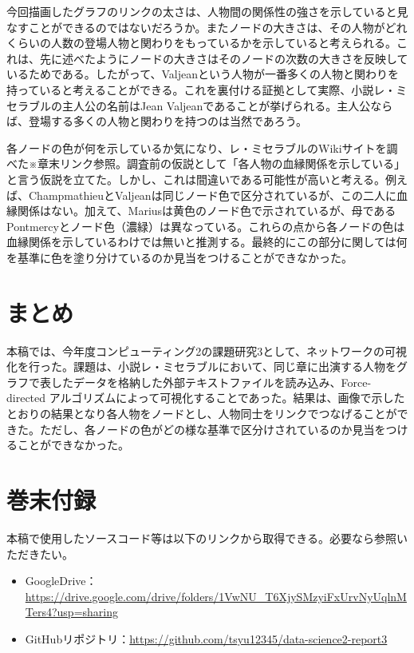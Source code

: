 \documentclass[dvipdfmx]{jsarticle}
\begin{document}
今回描画したグラフのリンクの太さは、人物間の関係性の強さを示していると見なすことができるのではないだろうか。またノードの大きさは、その人物がどれくらいの人数の登場人物と関わりをもっているかを示していると考えられる。これは、先に述べたようにノードの大きさはそのノードの次数の大きさを反映しているためである。したがって、Valjeanという人物が一番多くの人物と関わりを持っていると考えることができる。これを裏付ける証拠として実際、小説レ・ミセラブルの主人公の名前はJean Valjeanであることが挙げられる。主人公ならば、登場する多くの人物と関わりを持つのは当然であろう。\par
各ノードの色が何を示しているか気になり、レ・ミセラブルのWikiサイトを調べた※章末リンク参照。調査前の仮説として「各人物の血縁関係を示している」と言う仮説を立てた。しかし、これは間違いである可能性が高いと考える。例えば、ChampmathieuとValjeanは同じノード色で区分されているが、この二人に血縁関係はない。加えて、Mariusは黄色のノード色で示されているが、母であるPontmercyとノード色（濃緑）は異なっている。これらの点から各ノードの色は血縁関係を示しているわけでは無いと推測する。最終的にこの部分に関しては何を基準に色を塗り分けているのか見当をつけることができなかった。
\section{まとめ}
本稿では、今年度コンピューティング2の課題研究3として、ネットワークの可視化を行った。課題は、小説レ・ミセラブルにおいて、同じ章に出演する人物をグラフで表したデータを格納した外部テキストファイルを読み込み、Force-directed アルゴリズムによって可視化することであった。結果は、画像で示したとおりの結果となり各人物をノードとし、人物同士をリンクでつなげることができた。ただし、各ノードの色がどの様な基準で区分けされているのか見当をつけることができなかった。
\section{巻末付録}
本稿で使用したソースコード等は以下のリンクから取得できる。必要なら参照いただきたい。
\begin{itemize}
  \item GoogleDrive：\url{https://drive.google.com/drive/folders/1VwNU_T6XjySMzyiFxUrvNyUqlnMTers4?usp=sharing}
  \item GitHubリポジトリ：\url{https://github.com/tsyu12345/data-science2-report3}
\end{itemize}
\end{document}
